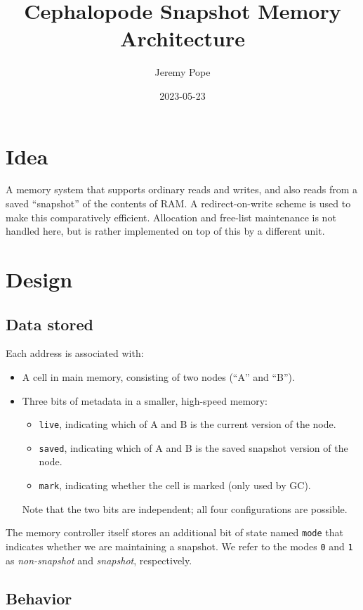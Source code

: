 \documentclass[a4paper]{article}
\title{Cephalopode Snapshot Memory Architecture}
\author{Jeremy Pope}
\date{2023-05-23}
\newcommand{\code}[1]{\texttt{#1}}
\begin{document}
\maketitle

\section{Idea}

A memory system that supports ordinary reads and writes, and also reads from a saved ``snapshot'' of the contents of RAM.
%
A redirect-on-write scheme is used to make this comparatively efficient.
%
Allocation and free-list maintenance is not handled here, but is rather implemented on top of this by a different unit.

\section{Design}

\subsection{Data stored}

Each address is associated with:
\begin{itemize}
\item A cell in main memory, consisting of two nodes (``A'' and ``B'').
\item Three bits of metadata in a smaller, high-speed memory:
\begin{itemize}
\item \code{live}, indicating which of A and B is the current version of the node.
\item \code{saved}, indicating which of A and B is the saved snapshot version of the node.
\item \code{mark}, indicating whether the cell is marked (only used by GC).
\end{itemize}
Note that the two bits are independent; all four configurations are possible.
\end{itemize}

The memory controller itself stores an additional bit of state named \code{mode} that indicates whether we are maintaining a snapshot.
%
We refer to the modes \code{0} and \code{1} as \emph{non-snapshot} and \emph{snapshot}, respectively.

\subsection{Behavior}
\end{document}
